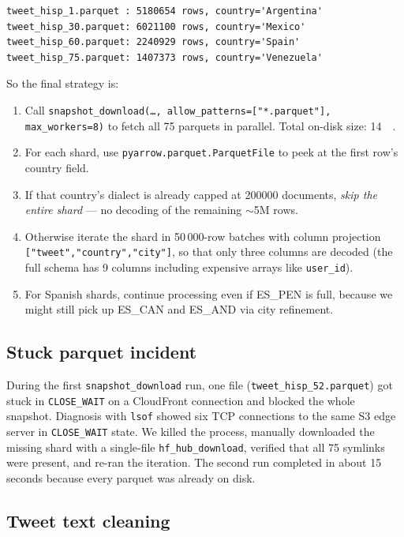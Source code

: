 \documentclass[11pt,a4paper]{article}
\begin{document}
\begin{lstlisting}[style=shellcode]
tweet_hisp_1.parquet : 5180654 rows, country='Argentina'
tweet_hisp_30.parquet: 6021100 rows, country='Mexico'
tweet_hisp_60.parquet: 2240929 rows, country='Spain'
tweet_hisp_75.parquet: 1407373 rows, country='Venezuela'
\end{lstlisting}

So the final strategy is:

\begin{enumerate}
  \item Call \texttt{snapshot\_download(\ldots, allow\_patterns=["*.parquet"], max\_workers=8)}
        to fetch all 75 parquets in parallel. Total on-disk size:
        \SI{14}{\giga\byte}.
  \item For each shard, use \texttt{pyarrow.parquet.ParquetFile} to peek
        at the first row's country field.
  \item If that country's dialect is already capped at
        \num{200000} documents, \emph{skip the entire shard} --- no
        decoding of the remaining $\sim$5M rows.
  \item Otherwise iterate the shard in 50\,000-row batches with column
        projection \texttt{["tweet","country","city"]}, so that only
        three columns are decoded (the full schema has 9 columns
        including expensive arrays like \texttt{user\_id}).
  \item For Spanish shards, continue processing even if ES\_PEN is full,
        because we might still pick up ES\_CAN and ES\_AND via city
        refinement.
\end{enumerate}

\subsection{Stuck parquet incident}

During the first \texttt{snapshot\_download} run, one file
(\texttt{tweet\_hisp\_52.parquet}) got stuck in \texttt{CLOSE\_WAIT} on a
CloudFront connection and blocked the whole snapshot. Diagnosis with
\texttt{lsof} showed six TCP connections to the same S3 edge server in
\texttt{CLOSE\_WAIT} state. We killed the process, manually downloaded
the missing shard with a single-file \texttt{hf\_hub\_download}, verified
that all 75 symlinks were present, and re-ran the iteration. The second
run completed in about 15 seconds because every parquet was already on
disk.

\subsection{Tweet text cleaning}
\end{document}

